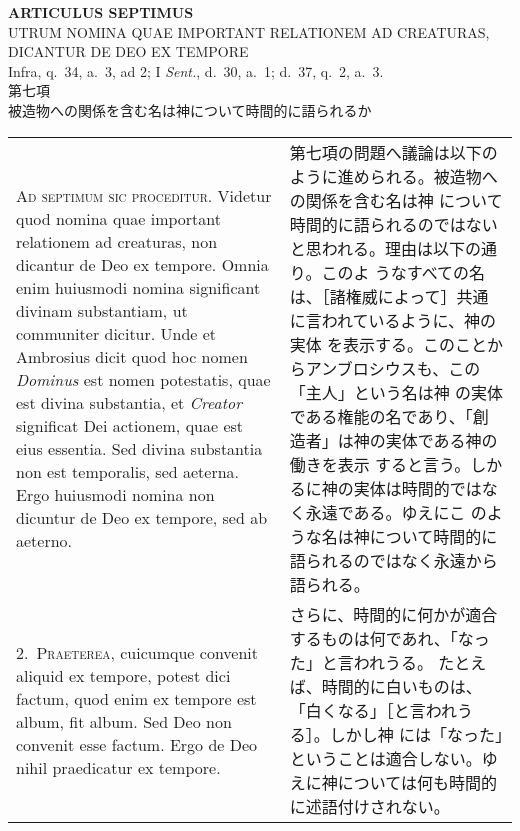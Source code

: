 \documentclass[10pt]{jsarticle} %
\begin{document}
\begin{center}
 {\Large {\bf ARTICULUS SEPTIMUS}}\\
 {\large UTRUM NOMINA QUAE IMPORTANT RELATIONEM AD CREATURAS, DICANTUR
 DE DEO EX TEMPORE}\\
 {\footnotesize Infra, q.~34, a.~3, ad 2; I {\itshape Sent.}, d.~30,
 a.~1; d.~37, q.~2, a.~3.}\\
 {\Large 第七項\\被造物への関係を含む名は神について時間的に語られるか}
\end{center}

\begin{longtable}{p{21em}p{21em}}



{\huge A}{\scshape d septimum sic proceditur}. Videtur quod nomina quae
 important relationem ad creaturas, non dicantur de Deo ex
 tempore. Omnia enim huiusmodi nomina significant divinam substantiam,
 ut communiter dicitur. Unde et Ambrosius dicit quod hoc nomen {\itshape
 Dominus} est nomen potestatis, quae est divina substantia, et {\itshape
 Creator} significat Dei actionem, quae est eius essentia. Sed divina
 substantia non est temporalis, sed aeterna. Ergo huiusmodi nomina non
 dicuntur de Deo ex tempore, sed ab aeterno.


&

第七項の問題へ議論は以下のように進められる。被造物への関係を含む名は神
について時間的に語られるのではないと思われる。理由は以下の通り。このよ
うなすべての名は、［諸権威によって］共通に言われているように、神の実体
を表示する。このことからアンブロシウスも、この「主人」という名は神
の実体である権能の名であり、「創造者」は神の実体である神の働きを表示
すると言う。しかるに神の実体は時間的ではなく永遠である。ゆえにこ
のような名は神について時間的に語られるのではなく永遠から語られる。

\\


2.~{\scshape Praeterea}, cuicumque convenit aliquid ex tempore, potest
dici factum, quod enim ex tempore est album, fit album. Sed Deo non
convenit esse factum. Ergo de Deo nihil praedicatur ex tempore.

&

さらに、時間的に何かが適合するものは何であれ、「なった」と言われうる。
たとえば、時間的に白いものは、「白くなる」［と言われうる］。しかし神
には「なった」ということは適合しない。ゆえに神については何も時間的
に述語付けされない。

\\




\end{longtable}
\end{document}
